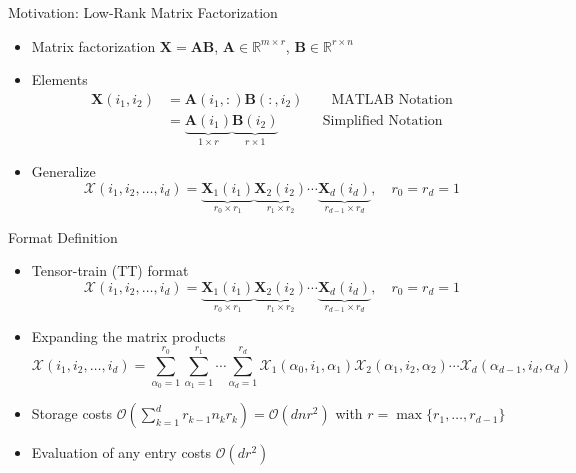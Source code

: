 \documentclass[aspectratio=169]{beamer}
\newcommand{\Mat}[1]{\mathbf{#1}}
\newcommand{\Tns}[1]{\mathcal{#1}}
\newcommand{\Ord}{\mathcal{O}}
\newcommand{\RR}{\mathbb{R}}
\begin{document}
\begin{frame}{Motivation: Low-Rank Matrix Factorization}
  \begin{itemize}
    \item
      Matrix factorization $\Mat{X} = \Mat{A} \Mat{B}$, $\Mat{A} \in \RR^{m
      \times r}$, $\Mat{B} \in \RR^{r \times n}$
    \item
      Elements
      \begin{equation*}
        \begin{split}
          \Mat{X}(i_1, i_2)
          &= \Mat{A}(i_1, :) \Mat{B}(:, i_2) \qquad \text{MATLAB Notation} \\
          &= \underbrace{\Mat{A}(i_1)}_{1 \times r} \underbrace{\Mat{B}(i_2)}_{r
          \times 1} \,\quad\qquad \text{Simplified Notation}
        \end{split}
      \end{equation*}
    \item
      Generalize
      \begin{equation*}
        \Tns{X}(i_1, i_2, \ldots, i_d) = \underbrace{\Mat{X}_1(i_1)}_{r_0 \times
        r_1} \underbrace{\Mat{X}_2(i_2)}_{r_1 \times r_2} \cdots
        \underbrace{\Mat{X}_d(i_d)}_{r_{d - 1} \times r_d}, \quad r_0 = r_d = 1
      \end{equation*}
  \end{itemize}
\end{frame}

\begin{frame}{Format Definition}
  \begin{itemize}
    \item
      Tensor-train (TT) format
      \begin{equation*}
        \Tns{X}(i_1, i_2, \ldots, i_d) = \underbrace{\Mat{X}_1(i_1)}_{r_0 \times
        r_1} \underbrace{\Mat{X}_2(i_2)}_{r_1 \times r_2} \cdots
        \underbrace{\Mat{X}_d(i_d)}_{r_{d - 1} \times r_d}, \quad r_0 = r_d = 1
      \end{equation*}
    \item
      Expanding the matrix products
      \begin{equation*}
        \Tns{X}(i_1, i_2, \ldots, i_d) = \sum_{\alpha_0 = 1}^{r_0}
        \sum_{\alpha_1 = 1}^{r_1} \cdots \sum_{\alpha_d = 1}^{r_d}
        \Tns{X}_1(\alpha_0, i_1, \alpha_1) \Tns{X}_2(\alpha_1, i_2, \alpha_2)
        \cdots \Tns{X}_d(\alpha_{d - 1}, i_d, \alpha_d)
      \end{equation*}
    \item
      Storage costs $\Ord(\sum_{k = 1}^d r_{k - 1} n_k r_k) = \Ord(d n r^2)$
      with $r = \max\{r_1, \ldots, r_{d - 1}\}$
    \item
      Evaluation of any entry costs $\Ord(d r^2)$
  \end{itemize}
\end{frame}
\end{document}
